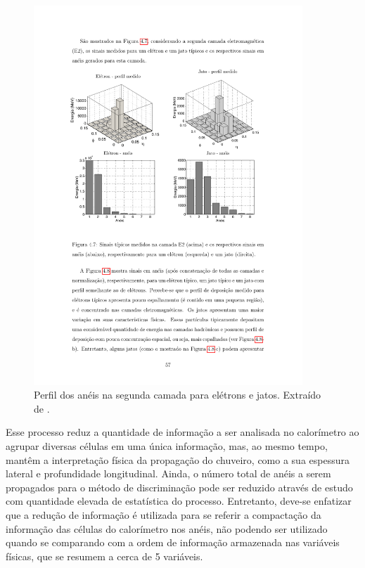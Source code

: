 \begin{figure}[ht!]
\label{fig:perfil_aneis}
\centering
\includegraphics[width=0.9\textwidth]{imagens/segunda_camada_celulas.pdf}
\caption[Perfil dos anéis na segunda camada para elétrons e jatos.]{Perfil dos
anéis na segunda camada para elétrons e jatos. Extraído de \cite{tese_eduardo}.}
\end{figure}

Esse processo reduz a quantidade de informação a ser analisada no calorímetro ao
agrupar diversas células em uma única informação, mas, ao mesmo tempo, mantêm a interpretação 
física da propagação do chuveiro, como a sua espessura
lateral e profundidade longitudinal. Ainda, o número total de anéis a serem
propagados para o método de discriminação pode ser reduzido através de estudo
com quantidade elevada de estatística do processo. Entretanto, deve-se enfatizar
que a redução de informação é utilizada para se referir a compactação da
informação das células do calorímetro nos anéis, não podendo ser utilizado quando se comparando 
com a ordem de informação armazenada nas variáveis físicas, que se resumem a cerca de 5 variáveis.

